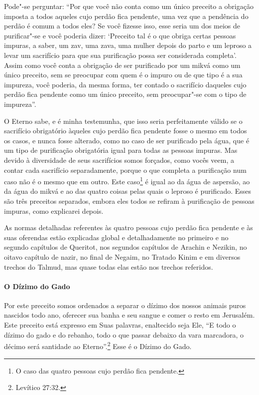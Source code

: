 \begin{multicols}{2}
Pode"-se perguntar: ``Por que você não conta como um único preceito a
obrigação imposta a todos aqueles cujo perdão fica pendente, uma vez que
a pendência do perdão é comum a todos eles? Se você fizesse isso, esse
seria um dos meios de purificar"-se e você poderia dizer: `Preceito tal é
o que obriga certas pessoas impuras, a saber, um zav\starr, uma
zava\starr, uma mulher depois do parto e um leproso a levar um
sacrifício para que sua purificação possa ser considerada completa'.
Assim como você conta a obrigação de ser purificado por um mikvá\starr{} como
um único preceito, sem se preocupar com quem é o impuro ou de que tipo é
a sua impureza, você poderia, da mesma forma, ter contado o sacrifício daqueles cujo perdão fica pendente como um único
preceito, sem preocupar"-se com o tipo de impureza''.

O Eterno sabe, e é minha testemunha, que isso seria perfeitamente válido
se o sacrifício obrigatório àqueles cujo perdão fica pendente fosse o
mesmo em todos os casos, e nunca fosse alterado, como no caso de ser
purificado pela água, que é um tipo de purificação obrigatória igual
para todas as pessoas impuras. Mas devido à diversidade de seus
sacrifícios somos forçados, como vocês veem, a contar cada sacrifício
separadamente, porque o que completa a purificação num caso não é o
mesmo que em outro. Este caso\footnote{O caso das quatro pessoas cujo perdão fica pendente.} é igual ao da água
de aspersão, ao da água do mikvá\starr{} e ao das quatro coisas pelas quais
o leproso é purificado. Esses são três preceitos separados, embora eles
todos se refiram à purificação de pessoas impuras, como explicarei
depois.

As normas detalhadas referentes às quatro pessoas cujo perdão fica
pendente e às suas oferendas estão explicadas global e detalhadamente no
primeiro e no segundo capítulos de Queritot\starr, nos segundos capítulos de
Arachin\starr{} e Nezikin\starr, no oitavo capítulo de nazir\starr, no final de Negaim\starr, no
Tratado Kinim\starr{} e em diversos trechos do Talmud\starr, mas quase todas elas
estão nos trechos referidos.

\paragraph{O Dízimo do Gado}

Por este preceito somos ordenados a separar o dízimo dos nossos animais
puros nascidos todo ano, oferecer sua banha e seu sangue e comer o resto
em Jerusalém. Este preceito está expresso em Suas palavras, enaltecido
seja Ele, ``E todo o dízimo do gado e do rebanho, todo o que passar
debaixo da vara marcadora, o décimo será santidade ao Eterno''.\footnote{Levítico 27:32.} Esse é o Dízimo do Gado.


\end{multicols}
